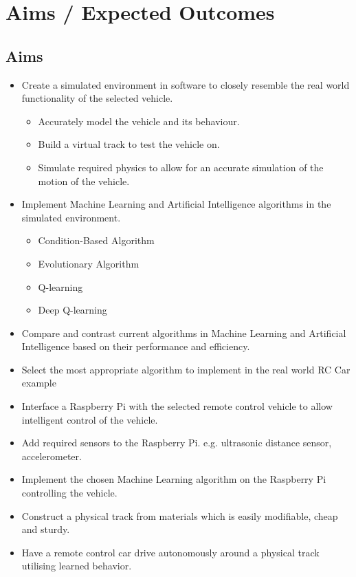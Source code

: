\documentclass[8pt]{article}
\begin{document}
\section{Aims / Expected Outcomes}

\subsection{Aims}
\begin{itemize}
	\item Create a simulated environment in software to closely resemble the real world functionality of the selected vehicle.
	\begin{itemize}
		\item Accurately model the vehicle and its behaviour.
		\item Build a virtual track to test the vehicle on.
		\item Simulate required physics to allow for an accurate simulation of the motion of the vehicle.
	\end{itemize}

	\item Implement Machine Learning and Artificial Intelligence algorithms in the simulated environment.
	\begin{itemize}
		\item Condition-Based Algorithm
		\item Evolutionary Algorithm
		\item Q-learning
		\item Deep Q-learning
	\end{itemize}

	\item Compare and contrast current algorithms in Machine Learning and Artificial Intelligence based on their performance and efficiency.

	\item Select the most appropriate algorithm to implement in the real world RC Car example

	\item Interface a Raspberry Pi with the selected remote control vehicle to allow intelligent control of the vehicle.

	\item Add required sensors to the Raspberry Pi. e.g. ultrasonic distance sensor, accelerometer.

	\item Implement the chosen Machine Learning algorithm on the Raspberry Pi controlling the vehicle.
	
	\item Construct a physical track from materials which is easily modifiable, cheap and sturdy.  
	
	\item Have a remote control car drive autonomously around a physical track utilising learned behavior.
\end{itemize}
\end{document}
